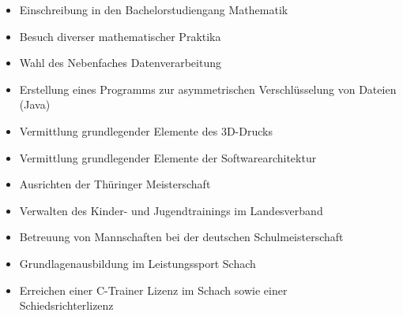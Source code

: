 \documentclass[10pt,a4paper,ragged2e,withhyper]{altacv}
\begin{document}
\begin{paracol}{2}


\begin{itemize}
\item Einschreibung in den Bachelorstudiengang Mathematik
\item Besuch diverser mathematischer Praktika
\end{itemize}


\divider

\begin{itemize}
\item Wahl des Nebenfaches Datenverarbeitung
\item Erstellung eines Programms zur asymmetrischen Verschlüsselung von
Dateien (Java)
\item Vermittlung grundlegender Elemente des 3D-Drucks
\item Vermittlung grundlegender Elemente der Softwarearchitektur
\end{itemize}

\divider

\begin{itemize}
\item Ausrichten der Thüringer Meisterschaft
\item Verwalten des Kinder- und Jugendtrainings im Landesverband

\end{itemize}

\divider

\begin{itemize}
\item Betreuung von Mannschaften bei der deutschen Schulmeisterschaft
\item Grundlagenausbildung im Leistungssport Schach
\item Erreichen einer C-Trainer Lizenz im Schach sowie einer\\ \mbox{Schiedsrichterlizenz}
\end{itemize}


\end{paracol}
\end{document}
